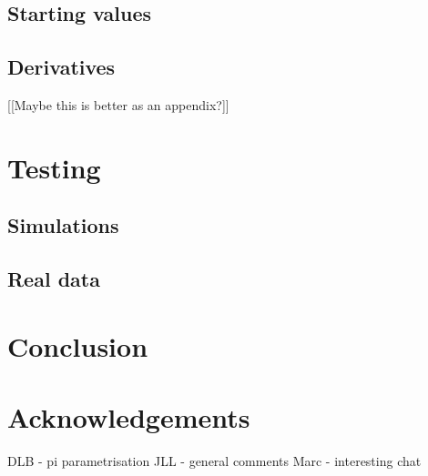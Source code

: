 \subsection{Starting values}

\subsection{Derivatives}
[[Maybe this is better as an appendix?]]


\section{Testing}

\subsection{Simulations}

\subsection{Real data}


\section{Conclusion}


\section{Acknowledgements}
DLB - pi parametrisation
JLL - general comments
Marc - interesting chat




